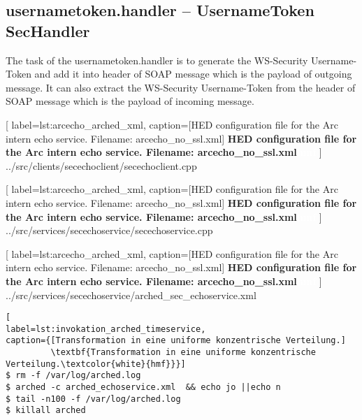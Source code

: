 \subsection{ usernametoken.handler – UsernameToken SecHandler}

The task of the usernametoken.handler is to generate the WS-Security Username-Token and add it into
header of SOAP message which is the payload of outgoing message. It can also extract the WS-Security
Username-Token from the header of SOAP message which is the payload of incoming message.





	[
	label=lst:arcecho_arched_xml,
	caption={[HED configuration file for the Arc intern echo service. Filename: arcecho\_no\_ssl.xml]
	\textbf{HED configuration file for the Arc intern echo service. Filename: arcecho\_no\_ssl.xml\textcolor{white}{hmf}}}
	]
{../src/clients/secechoclient/secechoclient.cpp}



	[
	label=lst:arcecho_arched_xml,
	caption={[HED configuration file for the Arc intern echo service. Filename: arcecho\_no\_ssl.xml]
	\textbf{HED configuration file for the Arc intern echo service. Filename: arcecho\_no\_ssl.xml\textcolor{white}{hmf}}}
	]
{../src/services/secechoservice/secechoservice.cpp}




\begin{minipage}[t]{\textwidth}

	[
	label=lst:arcecho_arched_xml,
	caption={[HED configuration file for the Arc intern echo service. Filename: arcecho\_no\_ssl.xml]
	\textbf{HED configuration file for the Arc intern echo service. Filename: arcecho\_no\_ssl.xml\textcolor{white}{hmf}}}
	]
{../src/services/secechoservice/arched_sec_echoservice.xml}
\end{minipage}



\begin{minipage}[t]{\textwidth}
\begin{lstlisting}[
label=lst:invokation_arched_timeservice,
caption={[Transformation in eine uniforme konzentrische Verteilung.]
         \textbf{Transformation in eine uniforme konzentrische Verteilung.\textcolor{white}{hmf}}}]
$ rm -f /var/log/arched.log
$ arched -c arched_echoservice.xml  && echo jo ||echo n
$ tail -n100 -f /var/log/arched.log
$ killall arched
\end{lstlisting}
\end{minipage}



